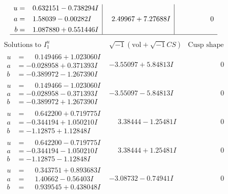 \documentclass[1p]{elsarticle_modified}
\theoremstyle{definition}
\newcommand{\I}{\sqrt{-1}}
\begin{document}
$$\begin{array}{c|c|c}
\begin{aligned}
u &= \phantom{-}0.632151 - 0.738294 I \\
a &= \phantom{-}1.58039 - 0.00282 I \\
b &= \phantom{-}1.087880 + 0.551446 I\end{aligned}
 & \phantom{-}2.49967 + 7.27688 I & \phantom{-0.000000 } 0\\
 \hline 
 \end{array}$$\newpage$$\begin{array}{c|c|c}  
\text{Solutions to }I^u_{1}& \I (\text{vol} + \sqrt{-1}CS) & \text{Cusp shape}\\
 \hline 
\begin{aligned}
u &= \phantom{-}0.149466 + 1.023060 I \\
a &= -0.028958 + 0.371393 I \\
b &= -0.389972 - 1.267390 I\end{aligned}
 & -3.55097 + 5.84813 I & \phantom{-0.000000 } 0 \\ \hline\begin{aligned}
u &= \phantom{-}0.149466 - 1.023060 I \\
a &= -0.028958 - 0.371393 I \\
b &= -0.389972 + 1.267390 I\end{aligned}
 & -3.55097 - 5.84813 I & \phantom{-0.000000 } 0 \\ \hline\begin{aligned}
u &= \phantom{-}0.642200 + 0.719775 I \\
a &= -0.344194 + 1.050210 I \\
b &= -1.12875 + 1.12848 I\end{aligned}
 & \phantom{-}3.38444 - 1.25481 I & \phantom{-0.000000 } 0 \\ \hline\begin{aligned}
u &= \phantom{-}0.642200 - 0.719775 I \\
a &= -0.344194 - 1.050210 I \\
b &= -1.12875 - 1.12848 I\end{aligned}
 & \phantom{-}3.38444 + 1.25481 I & \phantom{-0.000000 } 0 \\ \hline\begin{aligned}
u &= \phantom{-}0.343751 + 0.893683 I \\
a &= \phantom{-}1.40662 - 0.56403 I \\
b &= \phantom{-}0.939545 + 0.438048 I\end{aligned}
 & -3.08732 - 0.74941 I & \phantom{-0.000000 } 0 \\ \hline\begin{aligned}

\end{aligned}
\end{array}$$
\end{document}
